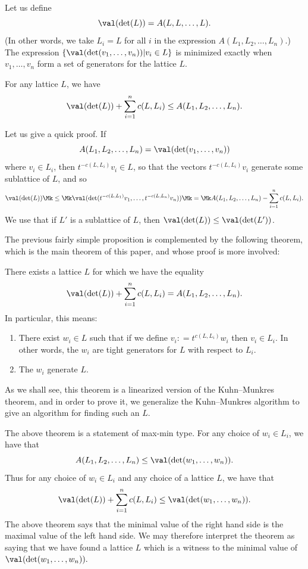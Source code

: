 Let us define 
\[
\val(\det(L)) = A(L,L,\dots, L).
\]
(In other words, we take $L_i=L$ for all $i$ in the expression $A(L_1, L_2, \dots, L_n)$.) The expression $\{\val(\det(v_1, \dots, v_n)) | v_i \in L\}$ is minimized exactly when $v_1, \dots, v_n$ form a set of generators for the lattice $L$.

\begin{prop} For any lattice $L$, we have
\[
\val(\det(L)) + \sum_{i=1}^n c(L,L_i) \leq A(L_1, L_2, \dots, L_n).
\]
\end{prop}
Let us give a quick proof. If
\[
A(L_1, L_2, \dots, L_n) = \val(\det(v_1, \dots, v_n))
\]
where $v_i \in L_i$, then $t^{-c(L,L_i)}v_i \in L$, so that the vectors $t^{-c(L,L_i)}v_i$ generate some sublattice of $L$, and so
\[
\val(\det(L)) \Mk \leq \Mk \val(\det(t^{-c(L,L_1)}v_1, \dots, t^{-c(L,L_n)}v_n)) \Mk = \Mk A(L_1, L_2, \dots, L_n) - \sum_{i=1}^n c(L,L_i).
\]
We use that if $L'$ is a sublattice of $L$, then $\val(\det(L)) \leq \val(\det(L'))$.

The previous fairly simple proposition is complemented by the following theorem, which is the main theorem of this paper, and whose proof is more involved:

\begin{theorem} \label{main} There exists a lattice $L$ for which we have the equality
\[
\val(\det(L)) + \sum_{i=1}^n c(L,L_i) = A(L_1, L_2, \dots, L_n).
\]
In particular, this means: 
\begin{enumerate}
\item There exist $w_i \in L$ such that if we define $v_i : = t^{c(L,L_i)} w_i$ then $v_i \in L_i$. In other words, the $w_i$ are tight generators for $L$ with respect to $L_i$.
\item The $w_i$ generate $L$.
\end{enumerate}
\end{theorem}

As we shall see, this theorem is a linearized version of the Kuhn--Munkres theorem, and in order to prove it, we generalize the Kuhn--Munkres algorithm to give an algorithm for finding such an $L$.

\begin{rema} The above theorem is a statement of max-min type. For any choice of $w_i \in L_i$, we have that 
\[
A(L_1, L_2, \dots, L_n) \leq \val(\det(w_1, \dots, w_n)).
\]
Thus for any choice of $w_i \in L_i$ and any choice of a lattice $L$, we have that
\[
\val(\det(L)) + \sum_{i=1}^n c(L,L_i) \leq \val(\det(w_1, \dots, w_n)).
\]
The above theorem says that the minimal value of the right hand side is the maximal value of the left hand side. We may therefore interpret the theorem as saying that we have found a lattice $L$ which is a witness to the minimal value of $\val(\det(w_1, \dots, w_n)).$
\end{rema}


